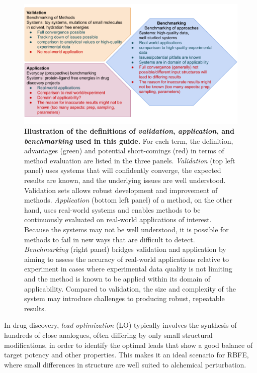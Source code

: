 \documentclass[9pt,bestpractices]{livecoms}
\begin{document}
\begin{figure}
    \includegraphics[width=0.95\linewidth]{figures/introduction/benchmarking_definition.png}
    \caption{
    \textbf{Illustration of the definitions of \textit{validation}, \textit{application}, and \textit{benchmarking} used in this guide.} 
    For each term, the definition, advantages (green) and potential short-comings (red) in terms of method evaluation are listed in the three panels.
    \textit{Validation} (top left panel) uses systems that will confidently converge, the expected results are known, and the underlying issues are well understood. 
    Validation sets allows robust development and improvement of methods.
    \textit{Application} (bottom left panel) of a method, on the other hand, uses real-world systems and enables methods to be continuously evaluated on real-world applications of interest.
    Because the systems may not be well understood, it is possible for methods to fail in new ways that are difficult to detect.
    \textit{Benchmarking} (right panel) bridges validation and application by aiming to assess the accuracy of real-world applications relative to experiment in cases where experimental data quality is not limiting and the method is known to be applied within its domain of applicability. 
    Compared to validation, the size and complexity of the system may introduce challenges to producing robust, repeatable results.
    }
    \label{fig:benchmarking_definition}
\end{figure}

In drug discovery, \emph{lead optimization} (LO) typically involves the synthesis of hundreds of close analogues, often differing by only small structural modifications, in order to identify the optimal leads that show a good balance of target potency and other properties. 
This makes it an ideal scenario for RBFE, where small differences in structure are well suited to alchemical perturbation. 
\end{document}
